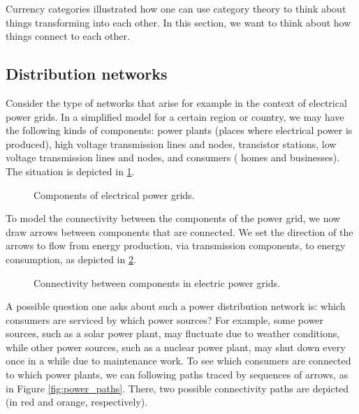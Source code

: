 
Currency categories illustrated how one can use category theory to think about things transforming into each other. In this section, we want to think about how things connect to each other.

\subsection{Distribution networks}

Consider the type of networks that arise for example in the context of electrical power grids. In a simplified model for a certain region or country, we may have the following kinds of components: power plants (places where electrical power is produced), high voltage transmission lines and nodes, transistor stations, low voltage transmission lines and nodes, and consumers ( homes and businesses). The situation is depicted in \cref{fig:power_nodes}.

\begin{figure}[h!]
\centering
 \caption{Components of electrical power grids.}
\label{fig:power_nodes}
\end{figure}
To model the connectivity between the components of the power grid, we now draw arrows between components that are connected. We set the direction of the arrows to flow from energy production, via transmission components, to energy consumption, as depicted in \cref{fig:power_nodes_connected}.
\begin{figure}[h!]
\centering
{}
 \caption{Connectivity between components in electric power grids.}
\label{fig:power_nodes_connected}
\end{figure}


A possible question one asks about such a power distribution network is: which consumers are serviced by which power sources? For example, some power sources, such as a solar power plant, may fluctuate due to weather conditions, while other power sources, such as a nuclear power plant, may shut down every once in a while due to maintenance work. To see which consumers are connected to which power plants, we can following paths traced by sequences of arrows, as in Figure \cref{fig:power_paths}. There, two possible connectivity paths are depicted (in red and orange, respectively).


